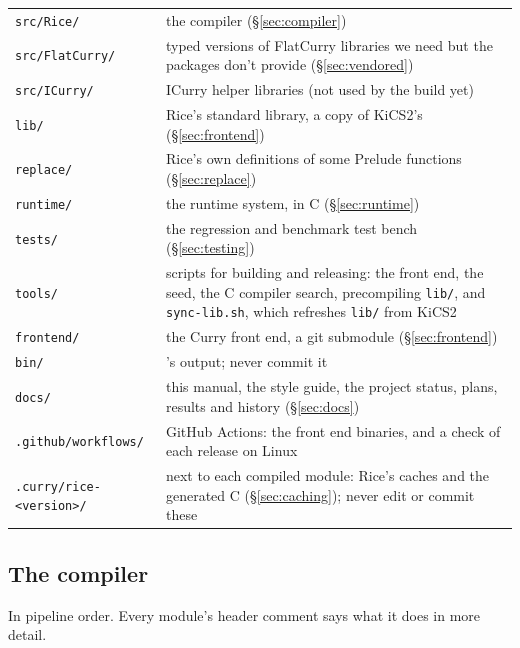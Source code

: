 \documentclass[11pt]{article}
\newcommand{\code}[1]{\texttt{\detokenize{#1}}}
\newcommand{\file}[1]{\nolinkurl{#1}}
\begin{document}
\begin{longtable}{@{}p{}p{}@{}}
\toprule
\file{src/Rice/} & the compiler (\S\ref{sec:compiler}) \\
\file{src/FlatCurry/} & typed versions of FlatCurry libraries we need but
  the packages don't provide (\S\ref{sec:vendored}) \\
\file{src/ICurry/} & ICurry helper libraries (not used by the build yet) \\
\file{lib/} & Rice's standard library, a copy of KiCS2's
  (\S\ref{sec:frontend}) \\
\file{replace/} & Rice's own definitions of some Prelude functions
  (\S\ref{sec:replace}) \\
\file{runtime/} & the runtime system, in C (\S\ref{sec:runtime}) \\
\file{tests/} & the regression and benchmark test bench (\S\ref{sec:testing}) \\
\file{tools/} & scripts for building and releasing: the front end, the seed,
  the C compiler search, precompiling \file{lib/}, and \file{sync-lib.sh},
  which refreshes \file{lib/} from KiCS2 \\
\file{frontend/} & the Curry front end, a git submodule (\S\ref{sec:frontend}) \\
\file{bin/} & \code{make frontend}'s output; never commit it \\
\file{docs/} & this manual, the style guide, the project status, plans,
  results and history (\S\ref{sec:docs}) \\
\file{.github/workflows/} & GitHub Actions: the front end binaries, and a
  check of each release on Linux \\
\midrule
\file{.curry/rice-<version>/} & next to each compiled module: Rice's caches and the
  generated C (\S\ref{sec:caching}); never edit or commit these \\
\bottomrule
\end{longtable}

\subsection{The compiler}

In pipeline order.  Every module's header comment says what it does in more
detail.
\end{document}
